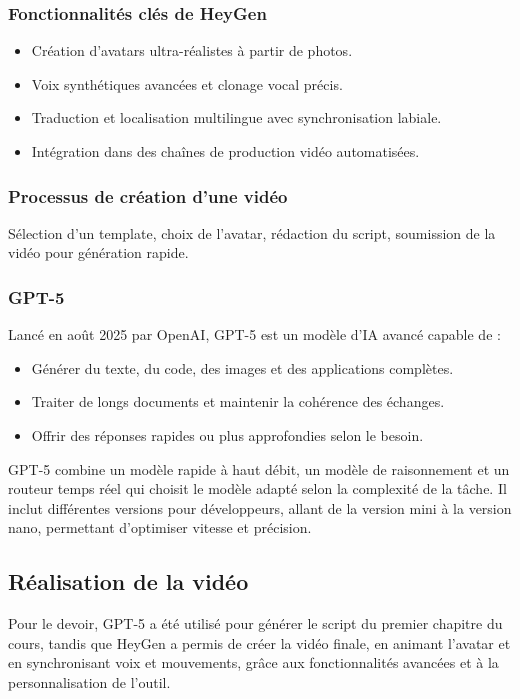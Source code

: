 \documentclass[12pt]{article}
\begin{document}
\begin{center}
\subsubsection*{Fonctionnalités clés de HeyGen}
\begin{itemize}[leftmargin=*, label=\textbullet]
    \item Création d’avatars ultra-réalistes à partir de photos.
    \item Voix synthétiques avancées et clonage vocal précis.
    \item Traduction et localisation multilingue avec synchronisation labiale.
    \item Intégration dans des chaînes de production vidéo automatisées.
\end{itemize}

\subsubsection*{Processus de création d’une vidéo}
Sélection d’un template, choix de l’avatar, rédaction du script, soumission de la vidéo pour génération rapide.

\subsubsection{GPT-5}
Lancé en août 2025 par OpenAI, GPT-5 est un modèle d’IA avancé capable de :
\begin{itemize}[leftmargin=*, label=\textbullet]
    \item Générer du texte, du code, des images et des applications complètes.
    \item Traiter de longs documents et maintenir la cohérence des échanges.
    \item Offrir des réponses rapides ou plus approfondies selon le besoin.
\end{itemize}

GPT-5 combine un modèle rapide à haut débit, un modèle de raisonnement et un routeur temps réel qui choisit le modèle adapté selon la complexité de la tâche. Il inclut différentes versions pour développeurs, allant de la version mini à la version nano, permettant d’optimiser vitesse et précision.

\subsection{Réalisation de la vidéo}
Pour le devoir, GPT-5 a été utilisé pour générer le script du premier chapitre du cours, tandis que HeyGen a permis de créer la vidéo finale, en animant l’avatar et en synchronisant voix et mouvements, grâce aux fonctionnalités avancées et à la personnalisation de l’outil.


\end{center}
\end{document}
